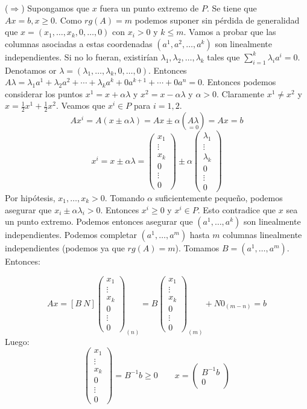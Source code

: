 \documentclass[PM.tex]{subfiles}
\begin{document}
\begin{dem}
($\Rightarrow$) Supongamos que $x$ fuera un punto extremo de $P$. Se tiene que $Ax=b, x ≥ 0$. Como $rg(A) = m$ podemos suponer sin pérdida de generalidad que $x =(x_1,\dots,x_k,0,\dots,0)$ con $x_i > 0$ y $k ≤ m$.
Vamos a probar que las columnas asociadas a estas coordenadas $(a^1, a^2, \dots, a^k)$ son linealmente independientes. Si no lo fueran, existirían $λ_1,λ_2, \dots, λ_k$ tales que $\sum_{i=1}^k λ_i a^i = 0$. Denotamos or $λ =(λ_1,\dots,λ_k,0,\dots,0)$. Entonces $Aλ=λ_1a^1 + λ_2a^2 + \cdots + λ_ka^k + 0a^{k+1}+\cdots+0a^n = 0$. Entonces podemos considerar los puntos $x^1 = x+αλ$ y $x^2 = x-αλ$ y $α > 0$. Claramente $x^1 \neq x^2$ y $x = \frac{1}{2}x^1+ \frac{1}{2}x^2$. Veamos que $x^i \in P$ para $i=1,2$.
\[ Ax^i = A(x \pm αλ) = Ax \pm α(\underset{=0}{Aλ}) = Ax = b \]
\[ x^i = x \pm αλ = \begin{pmatrix}x_1\\\vdots\\x_k\\0\\\vdots\\0\end{pmatrix} \pm α \begin{pmatrix}λ_1\\\vdots\\λ_k\\0\\\vdots\\0\end{pmatrix} \]
Por hipótesis, $x_1,\dots,x_k > 0$. Tomando $α$ suficientemente pequeño, podemos asegurar que $x_i \pm αλ_i > 0$. Entonces $x^i \geq 0$ y $x^i \in P$. Esto contradice que $x$ sea un punto extremo. Podemos entonces asegurar que $(a^1,\dots,a^k)$ son linealmente independientes. Podemos completar $(a^1,\dots,a^m)$ hasta $m$ columnas linealmente independientes (podemos ya que $rg(A) = m$). Tomamos $B = (a^1,\dots,a^m)$. Entonces:


\[ Ax =[B\ N]\begin{pmatrix}x_1\\\vdots\\x_k\\0\\\vdots\\0\end{pmatrix}_{(n)} = B \begin{pmatrix}x_1\\\vdots\\x_k\\0\\\vdots\\0\end{pmatrix}_{(m)} +N0_{(m-n)} = b \]
Luego: \[ \begin{pmatrix}x_1\\\vdots\\x_k\\0\\\vdots\\0\end{pmatrix} = B^{-1}b \geq 0 \qquad x = \begin{pmatrix}B^{-1}b\\0\end{pmatrix} \]
\end{dem}
\end{document}
